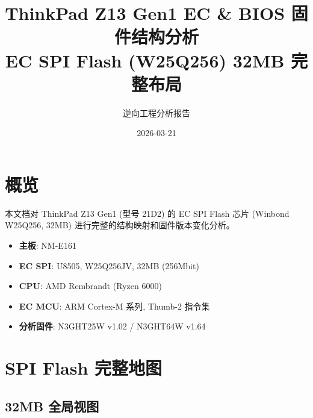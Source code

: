 \documentclass[a4paper,11pt,fontset=none]{ctexart}
\title{\textbf{ThinkPad Z13 Gen1 EC \& BIOS 固件结构分析}\\[4pt]
  \large EC SPI Flash (W25Q256) 32MB 完整布局}
\author{逆向工程分析报告}
\date{2026-03-21}
\begin{document}
\maketitle
\tableofcontents
\clearpage

\section{概览}

本文档对 ThinkPad Z13 Gen1 (型号 21D2) 的 EC SPI Flash 芯片 (Winbond W25Q256, 32MB) 进行完整的结构映射和固件版本变化分析。

\begin{itemize}[nosep]
  \item \textbf{主板}: NM-E161
  \item \textbf{EC SPI}: U8505, W25Q256JV, 32MB (256Mbit)
  \item \textbf{CPU}: AMD Rembrandt (Ryzen 6000)
  \item \textbf{EC MCU}: ARM Cortex-M 系列, Thumb-2 指令集
  \item \textbf{分析固件}: N3GHT25W v1.02 / N3GHT64W v1.64
\end{itemize}

\section{SPI Flash 完整地图}

\subsection{32MB 全局视图}
\end{document}
